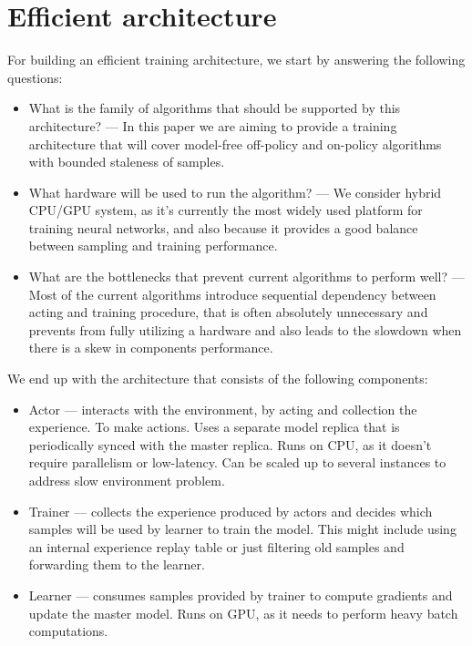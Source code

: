 \section{Efficient architecture}

For building an efficient training architecture, we start by answering the following questions:

\begin{itemize}
    \item What is the family of algorithms that should be supported by this architecture? --- In
    this paper we are aiming to provide a training architecture that will cover model-free
    off-policy and on-policy algorithms with bounded staleness of samples.

    \item What hardware will be used to run the algorithm? --- We consider hybrid CPU/GPU system,
    as it's currently the most widely used platform for training neural networks, and also because
    it provides a good balance between sampling and training performance.

    \item What are the bottlenecks that prevent current algorithms to perform well? --- Most of the
    current algorithms introduce sequential dependency between acting and training procedure, that
    is often absolutely unnecessary and prevents from fully utilizing a hardware and also leads to the
    slowdown when there is a skew in components performance.
\end{itemize}

We end up with the architecture that consists of the following components:
\begin{itemize}
    \item Actor --- interacts with the environment, by acting and collection the experience. To
        make actions. Uses a separate model replica that is periodically synced with the master replica.
        Runs on CPU, as it doesn't require parallelism or low-latency. Can be scaled up to several
        instances to address slow environment problem.

    \item Trainer --- collects the experience produced by actors and decides which samples will be
        used by learner to train the model. This might include using an internal experience replay
        table or just filtering old samples and forwarding them to the learner.

    \item Learner --- consumes samples provided by trainer to compute gradients and update the
        master model. Runs on GPU, as it needs to perform heavy batch computations.
\end{itemize}

